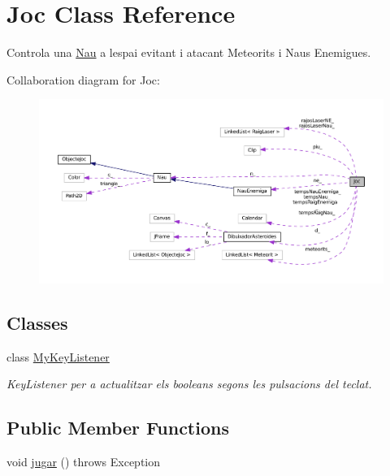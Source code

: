 \hypertarget{class_joc}{}\section{Joc Class Reference}
\label{class_joc}


Controla una \hyperlink{class_nau}{Nau} a l\textquotesingle{}espai evitant i atacant Meteorits i Naus Enemigues.  




Collaboration diagram for Joc\+:\nopagebreak
\begin{figure}[H]
\begin{center}
\leavevmode
\includegraphics[width=350pt]{class_joc__coll__graph}
\end{center}
\end{figure}
\subsection*{Classes}
\begin{DoxyCompactItemize}
\item 
class \hyperlink{class_joc_1_1_my_key_listener}{My\+Key\+Listener}
\begin{DoxyCompactList}\small\item\em Key\+Listener per a actualitzar els booleans segons les pulsacions del teclat. \end{DoxyCompactList}\end{DoxyCompactItemize}
\subsection*{Public Member Functions}
\begin{DoxyCompactItemize}
\item 
void \hyperlink{class_joc_aa5da4464cac2dc81f26430ac16fa7029}{jugar} ()  throws Exception 
\end{DoxyCompactItemize}
